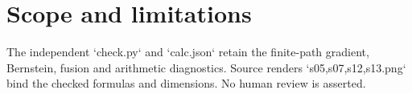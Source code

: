 \documentclass[10pt]{article}
\begin{document}
\section*{Scope and limitations}
The independent `check.py` and `calc.json` retain the finite-path gradient, Bernstein, fusion and arithmetic diagnostics. Source renders `s05,s07,s12,s13.png` bind the checked formulas and dimensions. No human review is asserted.\par
\end{document}
